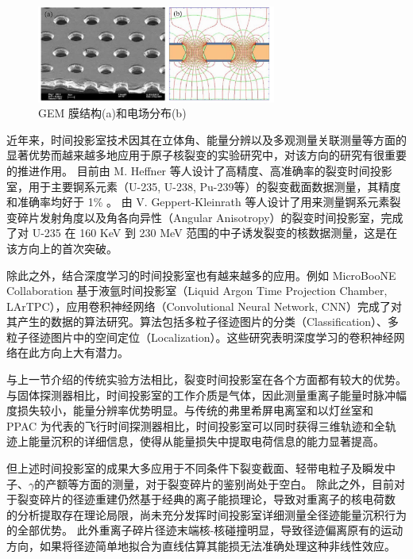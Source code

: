 \documentclass[AutoFakeBold]{LZUThesis}
\begin{document}
\begin{figure}[H]
    \centering
    \includegraphics[width=0.7\textwidth]{figures/GEM.png}
    \caption{GEM 膜结构(a)和电场分布(b)}
    \label{fig_GEM}
\end{figure}


近年来，时间投影室技术因其在立体角、能量分辨以及多观测量关联测量等方面的显著优势而越来越多地应用于原子核裂变的实验研究中，对该方向的研究有很重要的推进作用。
目前由 M. Heffner 等人设计了高精度、高准确率的裂变时间投影室，用于主要锕系元素（U-235, U-238, Pu-239等）的裂变截面数据测量，其精度和准确率均好于 1\% \cite{heffner2014time}。
由 V. Geppert-Kleinrath 等人设计了用来测量锕系元素裂变碎片发射角度以及角各向异性（Angular Anisotropy）的裂变时间投影室，完成了对 U-235 在 160 KeV 到 230 MeV 范围的中子诱发裂变的核数据测量，这是在该方向上的首次突破\cite{collaboration2019fission, hensle2020neutron}。

除此之外，结合深度学习的时间投影室也有越来越多的应用。例如 MicroBooNE Collaboration 基于液氩时间投影室（Liquid Argon Time Projection Chamber, LArTPC），应用卷积神经网络（Convolutional Neural Network, CNN）完成了对其产生的数据的算法研究。算法包括多粒子径迹图片的分类（Classification）、多粒子径迹图片中的空间定位（Localization）\cite{abratenko2020convolutional}。这些研究表明深度学习的卷积神经网络在此方向上大有潜力。


与上一节介绍的传统实验方法相比，裂变时间投影室在各个方面都有较大的优势。与固体探测器相比，时间投影室的工作介质是气体，因此测量重离子能量时脉冲幅度损失较小，能量分辨率优势明显。与传统的弗里希屏电离室和以灯丝室和 PPAC 为代表的飞行时间探测器相比，时间投影室可以同时获得三维轨迹和全轨迹上能量沉积的详细信息，使得从能量损失中提取电荷信息的能力显著提高。

但上述时间投影室的成果大多应用于不同条件下裂变截面、轻带电粒子及瞬发中子、$\gamma$的产额等方面的测量，对于裂变碎片的鉴别尚处于空白。
除此之外，目前对于裂变碎片的径迹重建仍然基于经典的离子能损理论，导致对重离子的核电荷数 的分析提取存在理论局限，尚未充分发挥时间投影室详细测量全径迹能量沉积行为的全部优势\cite{魏康2019基于GEM工艺的裂变时间投影室中裂变碎片的讨论}。
此外重离子碎片径迹末端核-核碰撞明显，导致径迹偏离原有的运动方向，如果将径迹简单地拟合为直线估算其能损无法准确处理这种非线性效应。
\end{document}

